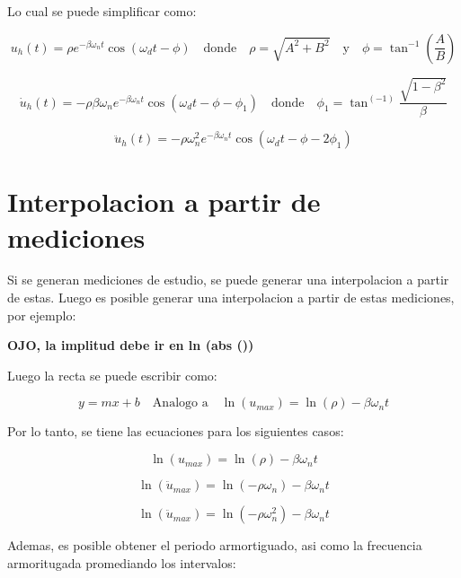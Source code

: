 \documentclass{article}  %
\begin{document}
Lo cual se puede simplificar como:

\begin{equation}
    u_h(t) = \rho e^{-\beta \omega_n t} \cos(\omega_d t - \phi) \quad \text{donde} \quad \rho = \sqrt{A^2 + B^2} \quad \text{y} \quad \phi = \tan^{-1}(\frac{A}{B})
\end{equation}

\begin{equation}
    \dot{u}_h(t) = -\rho \beta \omega_n e^{-\beta \omega_n t} \cos(\omega_d t - \phi -\phi_1) \quad \text{donde} \quad \phi_1 = \tan^(-1)\frac{\sqrt{1-\beta^2}}{\beta}
\end{equation}

\begin{equation}
    \ddot{u}_h(t) = -\rho \omega_n^2 e^{-\beta \omega_n t} \cos(\omega_d t - \phi - 2\phi_1)
\end{equation}

\section{Interpolacion a partir de mediciones}

Si se generan mediciones de estudio, se puede generar una interpolacion a partir de estas. Luego es posible generar una interpolacion a partir de estas mediciones, por ejemplo:

\textbf{OJO, la implitud debe ir en ln (abs ())}

Luego la recta se puede escribir como:

\begin{equation}
    y = mx + b \quad \text{Analogo a} \quad \ln(u_{max}) = \ln(\rho) - \beta \omega_n t
\end{equation}

Por lo tanto, se tiene las ecuaciones para los siguientes casos:

\begin{equation}
    \ln(u_{max}) = \ln(\rho) - \beta \omega_n t
\end{equation}

\begin{equation}
    \ln(\ddot{u}_{max}) = \ln(-\rho \omega_n) - \beta \omega_n t
\end{equation}

\begin{equation}
    \ln(\ddot{u}_{max}) = \ln(-\rho \omega^2_n) - \beta \omega_n t
\end{equation}


Ademas, es posible obtener el periodo armortiguado, asi como la frecuencia armoritugada promediando los intervalos:
\end{document}
